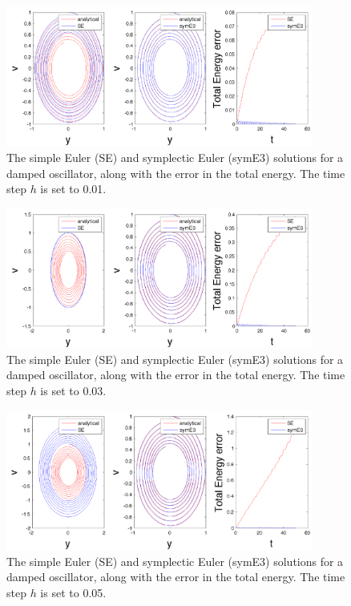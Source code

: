 \documentclass[11pt]{article}
\begin{document}
\begin{enumerate}
\begin{figure}[h!]
  \centering
    \includegraphics[width=0.9\textwidth]{andy_hw05_prb08_01.pdf}
  \caption{The simple Euler (SE) and symplectic Euler (symE3) solutions for a damped oscillator, along with the error in the total energy. The time step $h$ is set to 0.01.}
\end{figure}

\begin{figure}[h!]
  \centering
    \includegraphics[width=0.9\textwidth]{andy_hw05_prb08_03.pdf}
  \caption{The simple Euler (SE) and symplectic Euler (symE3) solutions for a damped oscillator, along with the error in the total energy. The time step $h$ is set to 0.03.}
\end{figure}

\begin{figure}[h!]
  \centering
    \includegraphics[width=0.9\textwidth]{andy_hw05_prb08_05.pdf}
  \caption{The simple Euler (SE) and symplectic Euler (symE3) solutions for a damped oscillator, along with the error in the total energy. The time step $h$ is set to 0.05.}
\end{figure}



\end{enumerate}
\end{document}

